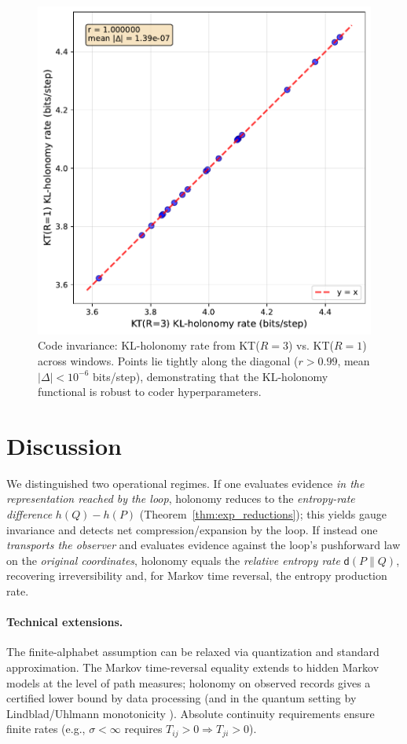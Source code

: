 \documentclass[11pt]{article}
\newcommand{\1}{\mathbbm{1}}
\begin{document}
\begin{figure}[t]
  \centering
  \includegraphics[width=0.85\linewidth]{figures/code_invariance_scatter.pdf}
  \caption{Code invariance: KL-holonomy rate from KT($R=3$) vs. KT($R=1$) across windows. Points lie tightly along the diagonal ($r > 0.99$, mean $|\Delta| < 10^{-6}$ bits/step), demonstrating that the KL-holonomy functional is robust to coder hyperparameters.}
  \label{fig:code-invariance}
\end{figure}

\section*{Discussion}
We distinguished two operational regimes. If one evaluates evidence \emph{in the representation reached by the loop}, holonomy reduces to the \emph{entropy-rate difference} $h(Q)-h(P)$ (Theorem~\ref{thm:exp_reductions}); this yields gauge invariance and detects net compression/expansion by the loop. If instead one \emph{transports the observer} and evaluates evidence against the loop's pushforward law on the \emph{original coordinates}, holonomy equals the \emph{relative entropy rate} $\mathsf{d}(P\|Q)$, recovering irreversibility and, for Markov time reversal, the entropy production rate.

\paragraph{Technical extensions.} The finite-alphabet assumption can be relaxed via quantization and standard approximation. The Markov time-reversal equality extends to hidden Markov models at the level of path measures; holonomy on observed records gives a certified lower bound by data processing (and in the quantum setting by Lindblad/Uhlmann monotonicity \cite{lindblad1975,uhlmann1977}). Absolute continuity requirements ensure finite rates (e.g., $\sigma<\infty$ requires $T_{ij}>0 \Rightarrow T_{ji}>0$).
\end{document}
